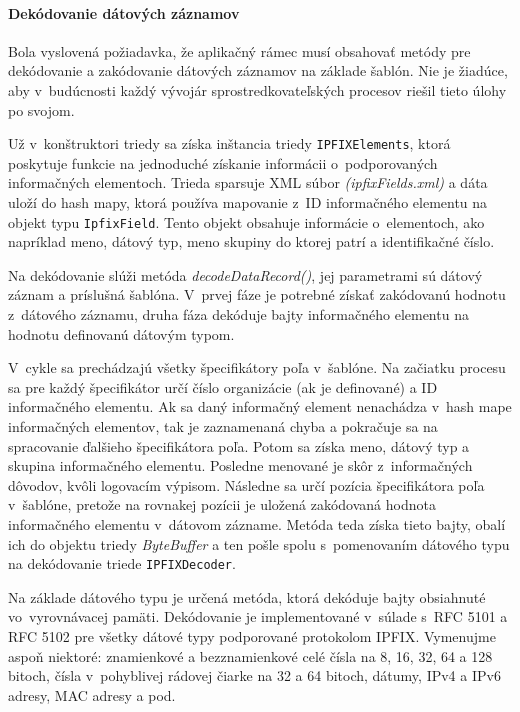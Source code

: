 \paragraph{Dekódovanie dátových záznamov} 
Bola vyslovená požiadavka, že aplikačný rámec musí obsahovať metódy pre dekódovanie a zakódovanie 
dátových záznamov na základe šablón. Nie je žiadúce, aby v~budúcnosti každý vývojár sprostredkovateľských 
procesov riešil tieto úlohy po svojom. 

Už v~konštruktori triedy sa získa inštancia triedy \verb|IPFIXElements|, ktorá poskytuje 
funkcie na jednoduché získanie informácii o~podporovaných informačných elementoch. Trieda sparsuje XML 
súbor \emph{(ipfixFields.xml)} a dáta uloží do hash mapy, ktorá používa mapovanie z~ID informačného 
elementu na objekt typu \verb|IpfixField|. Tento objekt obsahuje informácie o~elementoch, ako 
napríklad meno, dátový typ, meno skupiny do ktorej patrí a identifikačné číslo.\citep{veri}

Na dekódovanie slúži metóda \emph{decodeDataRecord()}, jej parametrami sú dátový záznam a príslušná
šablóna. V~prvej fáze je potrebné získať zakódovanú hodnotu z~dátového záznamu, druha fáza dekóduje 
bajty informačného elementu na hodnotu definovanú dátovým typom.

V~cykle sa prechádzajú všetky špecifikátory poľa v~šablóne. Na začiatku procesu sa pre každý 
špecifikátor určí číslo organizácie (ak je definované) a ID informačného elementu. Ak sa daný informačný
element nenachádza v~hash mape informačných elementov, tak je zaznamenaná chyba a pokračuje sa 
na spracovanie ďalšieho špecifikátora poľa. Potom sa získa meno, dátový typ a skupina informačného elementu. 
Posledne menované je skôr z~informačných dôvodov, kvôli logovacím výpisom. Následne sa určí pozícia 
špecifikátora poľa v~šablóne, pretože na rovnakej pozícii je uložená zakódovaná hodnota informačného
elementu v~dátovom zázname. Metóda teda získa tieto bajty, obalí ich do objektu triedy \emph{ByteBuffer}  
a ten pošle spolu s~pomenovaním dátového typu na dekódovanie triede \verb|IPFIXDecoder|.

Na základe dátového typu je určená metóda, ktorá dekóduje bajty obsiahnuté vo~vyrovnávacej pamäti.
Dekódovanie je implementované v~súlade s~RFC 5101 \citep{rfc5101} a 
RFC 5102 \citep{rfc5102} pre všetky dátové typy podporované protokolom IPFIX. Vymenujme aspoň niektoré:
znamienkové a bezznamienkové celé čísla na 8, 16, 32, 64 a 128 bitoch, čísla v~pohyblivej rádovej čiarke na 
32 a 64 bitoch, dátumy, IPv4 a IPv6 adresy, MAC adresy a pod. 

